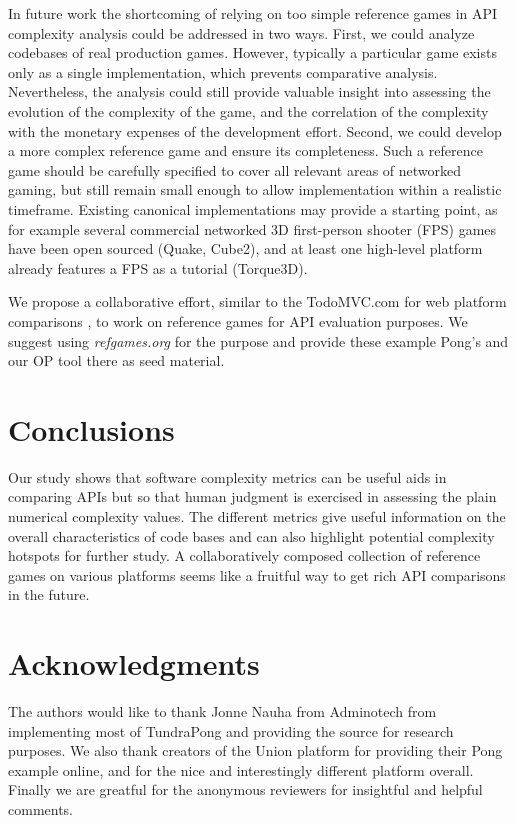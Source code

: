\documentclass[conference]{IEEEtran}
\begin{document}
In future work the shortcoming of relying on too simple reference
games in API complexity analysis could be addressed in two
ways. First, we could analyze codebases of real production
games. However, typically a particular game exists only as a single
implementation, which prevents comparative analysis. Nevertheless, the
analysis could still provide valuable insight into assessing the
evolution of the complexity of the game, and the correlation of the
complexity with the monetary expenses of the development
effort. Second, we could develop a more complex reference game and
ensure its completeness. Such a reference game should be carefully
specified to cover all relevant areas of networked gaming, but still
remain small enough to allow implementation within a realistic
timeframe. Existing canonical implementations may provide a starting
point, as for example several commercial networked 3D first-person
shooter (FPS) games have been open sourced (Quake, Cube2), and at
least one high-level platform already features a FPS as a tutorial
(Torque3D).

We propose a collaborative effort, similar to the TodoMVC.com for web
platform comparisons \cite{todomvc}, to work on reference games for
API evaluation purposes. We suggest using \emph{refgames.org} for the purpose
and provide these example Pong's and our OP tool there as seed material.

\section{Conclusions}

Our study shows that software complexity metrics can be useful aids in
comparing APIs but so that human judgment is exercised in assessing
the plain numerical complexity values. The different metrics give
useful information on the overall characteristics of code bases and
can also highlight potential complexity hotspots for further study. 
A collaboratively composed collection of reference games on various platforms
seems like a fruitful way to get rich API comparisons in the future.

\section*{Acknowledgments}
The authors would like to thank Jonne Nauha from Adminotech from implementing most of TundraPong and providing the source for research purposes.
We also thank creators of the Union platform for providing their Pong example online, and for the nice and interestingly different platform overall.
Finally we are greatful for the anonymous reviewers for insightful and helpful comments.


\end{document}
